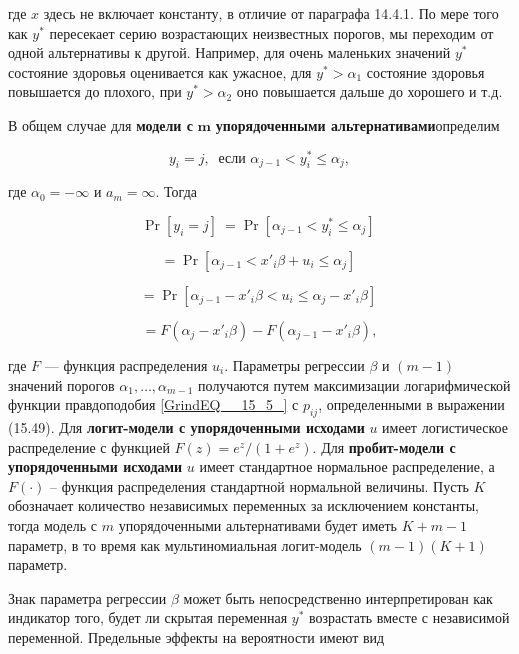 где $x$ здесь не включает константу, в отличие от параграфа 14.4.1. По мере того как $y^*$ пересекает серию возрастающих неизвестных порогов, мы переходим от одной альтернативы к другой. Например, для очень маленьких значений $y^*$ состояние здоровья оценивается как ужасное, для $y^*>{\alpha }_1$ состояние здоровья повышается до плохого, при $y^*>{\alpha }_2$ оно повышается дальше до хорошего и т.д.

В общем случае для \textbf{модели с } ${\mathbf m}$ \textbf{ упорядоченными альтернативами}определим

\begin{equation} \label{GrindEQ__15_48_} y_i=j,\ \text{ если } {\alpha }_{j-1}<y^*_i\le {\alpha }_j, \end{equation} 

где ${\alpha }_0=-\infty $ и $a_m=\infty $. Тогда

\[{\Pr  \left[y_i=j\right]\ }={\Pr  \left[{\alpha }_{j-1}<y^*_i\le {\alpha }_j\right]\ }\] 

\[={\Pr  \left[{\alpha }_{j-1}<x'_i\beta +u_i\le {\alpha }_j\right]\ }\] 

\begin{equation} \label{GrindEQ__15_43_} ={\Pr  \left[{\alpha }_{j-1}-x'_i\beta <u_i\le {\alpha }_j-x'_i\beta \right]\ } \end{equation} 

\[=F\left({\alpha }_j-x'_i\beta \right)-F\left({\alpha }_{j-1}-x'_i\beta \right),\] 

где $F$ --- функция распределения $u_i$. Параметры регрессии $\beta $ и $(m-1)$ значений порогов ${\alpha }_1,\dots ,{\alpha }_{m-1}$ получаются путем максимизации логарифмической функции правдоподобия \eqref{GrindEQ__15_5_} с $p_{ij}$, определенными в выражении (15.49). Для \textbf{логит-модели с упорядоченными исходами} $u$ имеет логистическое распределение с функцией $F\left(z\right)={e^z}/{(1+e^z)}$. Для \textbf{пробит-модели с упорядоченными исходами} $u$ имеет стандартное нормальное распределение, а $F(\cdot )$ -- функция распределения стандартной нормальной величины. Пусть $K$ обозначает количество независимых переменных за исключением константы, тогда модель с $m$ упорядоченными альтернативами будет иметь $K+m-1$ параметр, в то время как мультиномиальная логит-модель $(m-1)(K+1)$ параметр.

Знак параметра регрессии $\beta $ может быть непосредственно интерпретирован как индикатор того, будет ли скрытая переменная $y^*$ возрастать вместе с независимой переменной. Предельные эффекты на вероятности имеют вид

